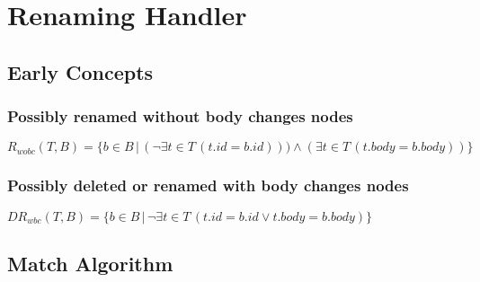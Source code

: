 \documentclass[../../Algorithms.tex]{subfiles}
\begin{document}
    \section{Renaming Handler}
    \subsection{Early Concepts}

    \subsubsection{Possibly renamed without body changes nodes}

    $R_{wobc}(T, B) = \{ b \in B \, | \, (\lnot \exists t \in T \, (t.id = b.id))) \land (\exists t \in T \, (t.body = b.body)) \}$

    \subsubsection{Possibly deleted or renamed with body changes nodes}

    $DR_{wbc}(T, B) = \{ b \in B \, | \, \lnot \exists t \in T \, (t.id = b.id \lor t.body = b.body) \}$

    \subsection{Match Algorithm}
    
\end{document}
